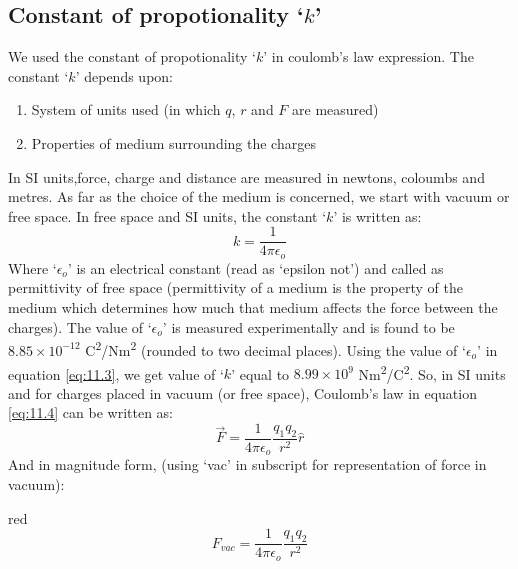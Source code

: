 \subsection*{Constant of propotionality `$k$'}
We used the constant of propotionality `$k$' in coulomb’s law expression.
The constant `$k$' depends upon:
\begin{enumerate}[label=(\alph*)]
\item System of units used (in which $q$, $r$ and $F$ are measured)
\item Properties of medium surrounding the charges
\end{enumerate}
In SI units,force, charge and distance are measured in newtons,
coloumbs and metres. As far as the choice of the medium is concerned,
we start with vacuum or free space. In free space and SI units,
the constant `$k$' is written as:
\begin{equation}\label{eq:11.3}
  k = \frac{1}{4\pi\epsilon_{o}}
\end{equation}
Where `$\epsilon_{o}$' is an electrical constant (read as `epsilon not’) and called
as permittivity of free space (permittivity of a medium is the property
of the medium which determines how much that medium affects the force
between the charges).
The value of `$\epsilon_{o}$' is measured experimentally and
is found to be $8.85\times 10^{-12}$ C\textsuperscript{2}/Nm\textsuperscript{2}
(rounded to two decimal places).
Using the value of `$\epsilon_{o}$' in equation \ref{eq:11.3}, we get value of `$k$' equal to
$8.99\times 10^{9}$ Nm\textsuperscript{2}/C\textsuperscript{2}.
So, in SI units and for charges placed in vacuum (or free space),
Coulomb’s law in equation \ref{eq:11.4} can be written as:
\begin{equation}\label{eq:11.4}
  \vec{F} = \frac{1}{4\pi\epsilon_{o}} \frac{q_{1}q_{2}}{r^{2}} \hat{r}
\end{equation}
And in magnitude form,
(using `vac’ in subscript for representation of force in vacuum):
\begin{mybox}{red}{}
\begin{equation}\label{eq:11.5}
  F_{vac} = \frac{1}{4\pi\epsilon_{o}} \frac{q_{1}q_{2}}{r^{2}}
\end{equation}
\end{mybox}
